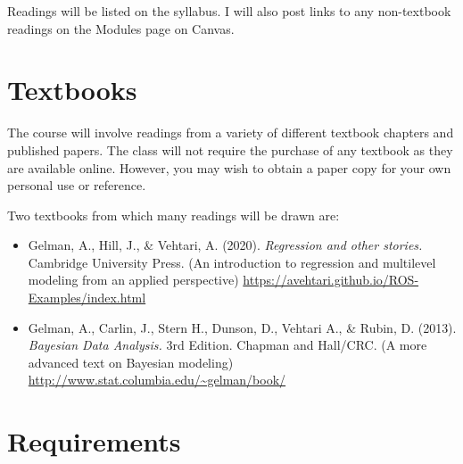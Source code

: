 \documentclass[11pt, article, oneside]{memoir}
\theoremstyle{Assumption}
\begin{document}
Readings will be listed on the syllabus. I will also post links to any non-textbook readings on the Modules page on Canvas.

\section*{Textbooks} 

The course will involve readings from a variety of different textbook chapters and published papers. The class will not require the purchase of any textbook as they are available online. However, you may wish to obtain a paper copy for your own personal use or reference.

Two textbooks from which many readings will be drawn are:

\begin{itemize}
\item Gelman, A., Hill, J., \& Vehtari, A. (2020). \textit{Regression and other stories.} Cambridge University Press. (An introduction to regression and multilevel modeling from an applied perspective) \url{https://avehtari.github.io/ROS-Examples/index.html}
\item Gelman, A., Carlin, J., Stern H., Dunson, D., Vehtari A., \& Rubin, D. (2013). \textit{Bayesian Data Analysis.} 3rd Edition. Chapman and Hall/CRC. (A more advanced text on Bayesian modeling) \url{http://www.stat.columbia.edu/~gelman/book/}
\end{itemize}


\section*{Requirements}
\end{document}
